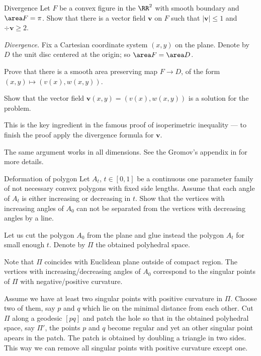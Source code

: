 \begin{pr}{}{Divergence}\label{Divergence} %
Let $F$ be a convex figure in the $\RR^2$ with smooth boundary
and $\area F=\pi$.
Show that there is a vector field $\bm{v}$ on $F$
such that $|\bm{v}|\le 1$ and $\div \bm{v}\ge 2$. 
\end{pr}

\textit{Divergence.}
Fix a Cartesian coordinate system $(x,y)$ on the plane.
Denote by $D$ the unit disc centered at the origin;
so $\area F=\area D$.
 
Prove that there is a smooth area preserving map $F\to D$, 
of the form
$(x,y)\mapsto (v(x),w(x,y))$.

Show that the vector field $\bm{v}(x,y)=(v(x),w(x,y))$
is a solution for the problem.

This is the key ingredient in the famous proof of isoperimetric inequality --- to finish the proof apply the divergence formula for $\bm{v}$.

The same argument works in all dimensions.
See the Gromov's appendix in \cite{gromov-apendix} for more details.












\begin{pr}{}{Deformation of polygon}\label{Deformation of polygon}
Let $A_t$, $t\in [0,1]$ be a continuous one parameter family of not necessary convex polygons with fixed side lengths.
Assume that each angle of $A_t$ is either increasing or decreasing in $t$.
Show that the vertices with increasing angles of $A_0$
can not be separated from the vertices with decreasing angles by a line.
\end{pr}


Let us cut the polygon $A_0$ from the plane and glue instead the polygon $A_t$ for small enough $t$.
Denote by $\Pi$ the obtained polyhedral space.

Note that 
$\Pi$ coincides with Euclidean plane outside of compact region.
The vertices with increasing/decreasing angles of $A_0$ 
correspond to the singular points of $\Pi$ with negative/positive curvature.

Assume we have at least two singular points with positive curvature in $\Pi$.
Choose two of them, 
say $p$ and $q$ which lie on the minimal distance from each other. 
Cut $\Pi$ along a geodesic $[pq]$
and patch the hole 
so that in the obtained polyhedral space, say $\Pi'$, 
the points $p$ and $q$ become regular and yet an other singular point apears in the patch. 
The patch is obtained by doubling a triangle in two sides.
This way we can remove all singular points with positive curvature except one.

